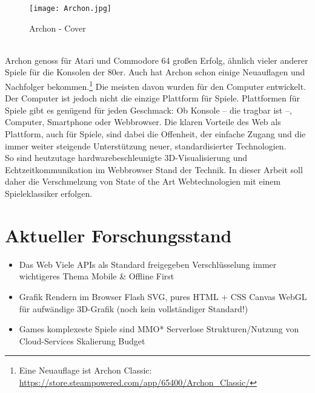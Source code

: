 \begin{figure}[htp]
\centering
\captionsetup{justification=centering}
\texttt{[image: Archon.jpg]}
\caption[Archon - Cover]{Archon - Cover\footnotemark}
\label{fig:Archon_Cover}
\end{figure}
\\
Archon genoss für Atari und Commodore 64 großen Erfolg, ähnlich vieler anderer Spiele für die Konsolen der 80er. Auch hat Archon schon einige Neuauflagen und Nachfolger bekommen.\footnote{Eine Neuauflage ist Archon Classic: \url{https://store.steampowered.com/app/65400/Archon_Classic/}}
Die meisten davon wurden für den Computer entwickelt. Der Computer ist jedoch nicht die einzige Plattform für Spiele.
Plattformen für Spiele gibt es genügend für jeden Geschmack: Ob Konsole -- die \ggf tragbar ist --, Computer, Smartphone oder Webbrowser.
Die klaren Vorteile des Web als Plattform, auch für Spiele, sind dabei die Offenheit, der einfache Zugang und die immer weiter steigende Unterstützung neuer, standardisierter Technologien.\\
So sind heutzutage hardwarebeschleunigte\footnotemark{} 3D-Visualisierung und Echtzeitkommunikation im Webbrowser Stand der Technik.
In dieser Arbeit soll daher die Verschmelzung von State of the Art Webtechnologien mit einem Spieleklassiker erfolgen.\\

\section{Aktueller Forschungsstand}
\label{sec:aktueller_forschungsstand}
\begin{itemize}
	\item Das Web
		\subitem Viele APIs als Standard freigegeben
		\subitem Verschlüsselung immer wichtigeres Thema
		\subitem Mobile \& Offline First
		\subitem 
	\item Grafik Rendern im Browser
		\subitem Flash
		\subitem SVG, pures HTML + CSS
		\subitem Canvas
		\subitem WebGL für aufwändige 3D-Grafik (noch kein vollständiger Standard!)
	\item Games
		\subitem komplexeste Spiele sind MMO*
		\subitem Serverlose Strukturen/Nutzung von Cloud-Services
		\subitem Skalierung
		\subitem Budget
\end{itemize}

